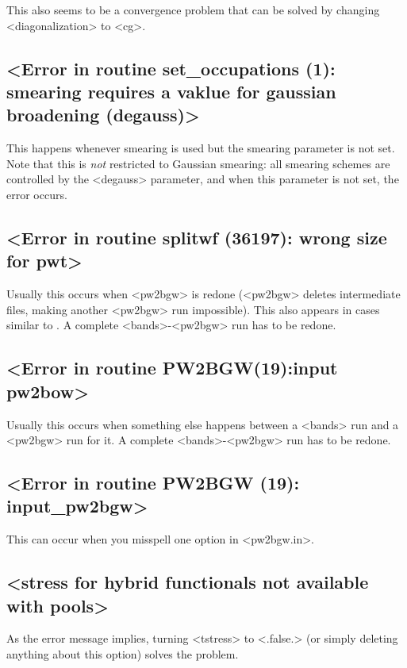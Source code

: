 \documentclass[hyperref, a4paper, 12pt]{report}
\def\texttt#1{<#1>}%
\newcommand{\shortcode}[1]{\texttt{#1}}
\begin{document}
This also seems to be a convergence problem 
that can be solved by changing \shortcode{diagonalization} to \shortcode{cg}.

\subsection{\shortcode{Error in routine  set_occupations (1): smearing requires a vaklue for gaussian broadening (degauss)}}

This happens whenever smearing is used 
but the smearing parameter is not set.
Note that this is \emph{not} restricted to Gaussian smearing:
all smearing schemes are controlled by the \shortcode{degauss} parameter, 
and when this parameter is not set, 
the error occurs.

\subsection{\shortcode{Error in routine  splitwf (36197): wrong size for pwt}}

Usually this occurs when \shortcode{pw2bgw} is redone
(\shortcode{pw2bgw} deletes intermediate files, 
making another \shortcode{pw2bgw} run impossible).
This also appears in cases similar to .
A complete \shortcode{bands}-\shortcode{pw2bgw} run has to be redone.

\subsection{\shortcode{Error in routine PW2BGW(19):input pw2bow}}

Usually this occurs when something else happens between a \shortcode{bands} run 
and a \shortcode{pw2bgw} run for it.
A complete \shortcode{bands}-\shortcode{pw2bgw} run has to be redone.

\subsection{\shortcode{Error in routine PW2BGW (19): input_pw2bgw}}

This can occur when you misspell one option in \shortcode{pw2bgw.in}.

\subsection{\shortcode{stress for hybrid functionals not available with pools}}

As the error message implies,  
turning \shortcode{tstress} to \shortcode{.false.} (or simply deleting anything about this option)
solves the problem.
\end{document}
